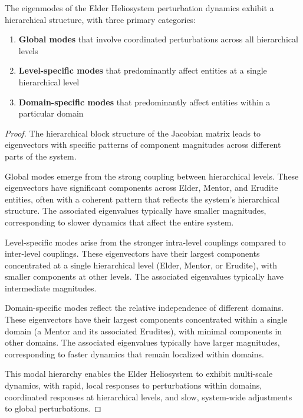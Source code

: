 \begin{theorem}
The eigenmodes of the Elder Heliosystem perturbation dynamics exhibit a hierarchical structure, with three primary categories:
\begin{enumerate}
    \item \textbf{Global modes} that involve coordinated perturbations across all hierarchical levels
    \item \textbf{Level-specific modes} that predominantly affect entities at a single hierarchical level
    \item \textbf{Domain-specific modes} that predominantly affect entities within a particular domain
\end{enumerate}
\end{theorem}

\begin{proof}
The hierarchical block structure of the Jacobian matrix leads to eigenvectors with specific patterns of component magnitudes across different parts of the system.

Global modes emerge from the strong coupling between hierarchical levels. These eigenvectors have significant components across Elder, Mentor, and Erudite entities, often with a coherent pattern that reflects the system's hierarchical structure. The associated eigenvalues typically have smaller magnitudes, corresponding to slower dynamics that affect the entire system.

Level-specific modes arise from the stronger intra-level couplings compared to inter-level couplings. These eigenvectors have their largest components concentrated at a single hierarchical level (Elder, Mentor, or Erudite), with smaller components at other levels. The associated eigenvalues typically have intermediate magnitudes.

Domain-specific modes reflect the relative independence of different domains. These eigenvectors have their largest components concentrated within a single domain (a Mentor and its associated Erudites), with minimal components in other domains. The associated eigenvalues typically have larger magnitudes, corresponding to faster dynamics that remain localized within domains.

This modal hierarchy enables the Elder Heliosystem to exhibit multi-scale dynamics, with rapid, local responses to perturbations within domains, coordinated responses at hierarchical levels, and slow, system-wide adjustments to global perturbations.
\end{proof}

